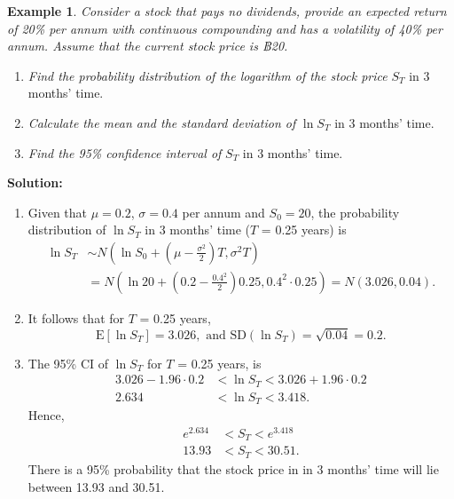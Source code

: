 \documentclass[
]{book}
\theoremstyle{definition}
\theoremstyle{definition}
\newtheorem{example}{Example}[chapter]
\theoremstyle{definition}
\theoremstyle{definition}
\theoremstyle{remark}
\begin{document}
\begin{example}

\emph{Consider a stock that pays no dividends, provide an expected return of
20\% per annum with continuous compounding and has a volatility of 40\%
per annum. Assume that the current stock price is ฿20.}

\begin{enumerate}
\def\labelenumi{\arabic{enumi}.}
\item
  \emph{Find the probability distribution of the logarithm of the stock
  price} \(S_T\) in 3 months' time.
\item
  \emph{Calculate the mean and the standard deviation of} \(\ln S_T\) in 3
  months' time.
\item
  \emph{Find the 95\% confidence interval of} \(S_T\) in 3 months' time.
\end{enumerate}

\end{example}

\textbf{Solution:}

\begin{enumerate}
\def\labelenumi{\arabic{enumi}.}
\item
  Given that \(\mu = 0.2\), \(\sigma = 0.4\) per annum and \(S_0 = 20\), the
  probability distribution of \(\ln S_T\) in 3 months' time (\(T\) = 0.25
  years) is \[\begin{aligned}
      \ln S_T &\sim  N\left(\ln S_0 +  (\mu - \frac{\sigma^2}{2})T,\sigma^2 T\right) \\
          &= N\left(\ln 20 +  (0.2 - \frac{0.4^2}{2}) 0.25,0.4^2 \cdot 0.25\right) = N(3.026,0.04).\end{aligned}\]
\item
  It follows that for \(T\) = 0.25 years,
  \[\mathrm{E}[\ln S_T] = 3.026,   \text{ and    } \text{SD}(\ln S_T) = \sqrt{0.04} = 0.2.\]
\item
  The 95\% CI of \(\ln S_T\) for \(T\) = 0.25 years, is \[\begin{aligned}
      3.026 - 1.96 \cdot 0.2 &< \ln S_T < 3.026 + 1.96 \cdot 0.2 \\
      2.634 &< \ln S_T < 3.418.\end{aligned}\] Hence,
  \[\begin{aligned}
      e^{2.634} &<  S_T < e^{3.418}\\
          13.93 &<  S_T < 30.51.
      \end{aligned}\] There is a 95\% probability that the stock price
  in in 3 months' time will lie between 13.93 and 30.51.
\end{enumerate}
\end{document}
